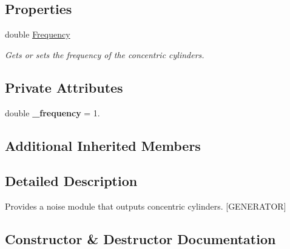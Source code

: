 \subsection*{Properties}
\begin{DoxyCompactItemize}
\item 
double \hyperlink{class_lib_noise_1_1_generator_1_1_cylinders_a2c700aa5d8e71d06366c4afe61cc0e73}{Frequency}
\begin{DoxyCompactList}\small\item\em Gets or sets the frequency of the concentric cylinders. \end{DoxyCompactList}\end{DoxyCompactItemize}
\subsection*{Private Attributes}
\begin{DoxyCompactItemize}
\item 
\mbox{\label{class_lib_noise_1_1_generator_1_1_cylinders_a3e8b5a8d65b067bbbf54e971830604c7}} 
double {\bfseries \+\_\+frequency} = 1.
\end{DoxyCompactItemize}
\subsection*{Additional Inherited Members}


\subsection{Detailed Description}
Provides a noise module that outputs concentric cylinders. \mbox{[}G\+E\+N\+E\+R\+A\+T\+OR\mbox{]} 



\subsection{Constructor \& Destructor Documentation}
\mbox{\label{class_lib_noise_1_1_generator_1_1_cylinders_a28c8d4d020928b281bb65b0d8c37c178}} 

